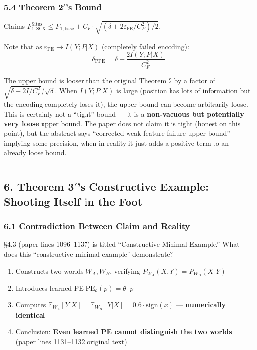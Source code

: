 \documentclass[
  12pt,
]{article}
\providecommand{\tightlist}{%
  \setlength{\itemsep}{0pt}\setlength{\parskip}{0pt}}
\begin{document}
\subsubsection{5.4 Theorem 2$'$'s Bound}\label{thm-2prime-tight}

Claims $F_{1,\text{SCX}}^{\text{Situs}} \leq F_{1,\text{base}} + C_F \cdot \sqrt{(\delta + 2\varepsilon_{\text{PE}}/C_F^2)/2}$.

Note that as $\varepsilon_{\text{PE}} \to I(Y;P|X)$ (completely failed encoding):
\[\delta_{\text{PPE}} = \delta + \frac{2I(Y;P|X)}{C_F^2}\]

The upper bound is looser than the original Theorem 2 by a factor of $\sqrt{\delta + 2I/C_F^2} / \sqrt{\delta}$. When $I(Y;P|X)$ is large (position has lots of information but the encoding completely loses it), the upper bound can become arbitrarily loose. This is certainly not a ``tight'' bound --- it is a \textbf{non-vacuous but potentially very loose} upper bound. The paper does not claim it is tight (honest on this point), but the abstract says ``corrected weak feature failure upper bound'' implying some precision, when in reality it just adds a positive term to an already loose bound.

\begin{center}\rule{0.5\linewidth}{0.5pt}\end{center}

\subsection{6. Theorem 3$'$'s Constructive Example: Shooting Itself in the Foot}\label{thm-3prime-constructive-example}

\subsubsection{6.1 Contradiction Between Claim and Reality}\label{contradiction-claim-reality}

\S4.3 (paper lines 1096--1137) is titled ``Constructive Minimal Example.'' What does this ``constructive minimal example'' demonstrate?

\begin{enumerate}
\def\labelenumi{\arabic{enumi}.}
\tightlist
\item
  Constructs two worlds $W_A, W_B$, verifying $P_{W_A}(X,Y) = P_{W_B}(X,Y)$ \checkmark
\item
  Introduces learned PE $\text{PE}_\theta(p) = \theta \cdot p$
\item
  Computes $\mathbb{E}_{W_A}[Y|X] = \mathbb{E}_{W_B}[Y|X] = 0.6 \cdot \text{sign}(x)$ --- \textbf{numerically identical}
\item
  Conclusion: \textbf{Even learned PE cannot distinguish the two worlds} (paper lines 1131--1132 original text)
\end{enumerate}
\end{document}
